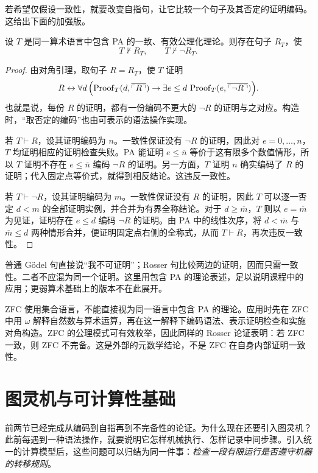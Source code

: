 \documentclass[lang=cn,a4paper,fontset=none,zihao=false,10pt,openany,twoside]{beautybook}
\numberwithin{algorithm}{chapter}
\begin{document}
若希望仅假设一致性，就要改变自指句，让它比较一个句子及其否定的证明编码。这给出下面的加强版。

\begin{theorem}\label{thm:goedel-rosser}
设 $T$ 是同一算术语言中包含 PA 的一致、有效公理化理论。则存在句子 $R_T$，使
\[
 T\nvdash R_T,\qquad T\nvdash\neg R_T.
\]
\end{theorem}
\begin{proof}
由对角引理，取句子 $R=R_T$，使 $T$ 证明
\[
 R\leftrightarrow\forall d\,\Bigl(
 \operatorname{Proof}_T(d,\overline{\ulcorner R\urcorner})
 \to\exists e\leq d\,
 \operatorname{Proof}_T(e,\overline{\ulcorner\neg R\urcorner})\Bigr).
\]
也就是说，每份 $R$ 的证明，都有一份编码不更大的 $\neg R$ 的证明与之对应。构造时，“取否定的编码”也由可表示的语法操作实现。

若 $T\vdash R$，设其证明编码为 $n$。一致性保证没有 $\neg R$ 的证明，因此对 $e=0,\ldots,n$，$T$ 均证明相应的证明检查失败。PA 能证明 $e\leq\overline n$ 等价于这有限多个数值情形，所以 $T$ 证明不存在 $e\leq\overline n$ 编码 $\neg R$ 的证明。另一方面，$T$ 证明 $n$ 确实编码了 $R$ 的证明；代入固定点等价式，就得到相反结论。这违反一致性。

若 $T\vdash\neg R$，设其证明编码为 $m$。一致性保证没有 $R$ 的证明，因此 $T$ 可以逐一否定 $d<m$ 的全部证明实例，并合并为有界全称结论。对于 $d\geq\overline m$，$T$ 则以 $e=\overline m$ 为见证，证明存在 $e\leq d$ 编码 $\neg R$ 的证明。由 PA 中的线性次序，将 $d<\overline m$ 与 $\overline m\leq d$ 两种情形合并，便证明固定点右侧的全称式，从而 $T\vdash R$，再次违反一致性。
\end{proof}
\begin{remark}[假设与适用范围]
普通 Gödel 句直接说“我不可证明”；Rosser 句比较两边的证明，因而只需一致性。二者不应混为同一个证明。这里用包含 PA 的理论表述，足以说明课程中的应用；更弱算术基础上的版本不在此展开。

ZFC 使用集合语言，不能直接视为同一语言中包含 PA 的理论。应用时先在 ZFC 中用 $\omega$ 解释自然数与算术运算，再在这一解释下编码语法、表示证明检查和实施对角构造。ZFC 的公理模式可有效枚举，因此同样的 Rosser 论证表明：若 ZFC 一致，则 ZFC 不完备。这是外部的元数学结论，不是 ZFC 在自身内部证明一致性。
\end{remark}

\section{图灵机与可计算性基础}\label{sec:turing-foundations}
前两节已经完成从编码到自指再到不完备性的论证。为什么现在还要引入图灵机？此前每遇到一种语法操作，就要说明它怎样机械执行、怎样记录中间步骤。引入统一的计算模型后，这些问题可以归结为同一件事：\emph{检查一段有限运行是否遵守机器的转移规则}。
\end{document}
